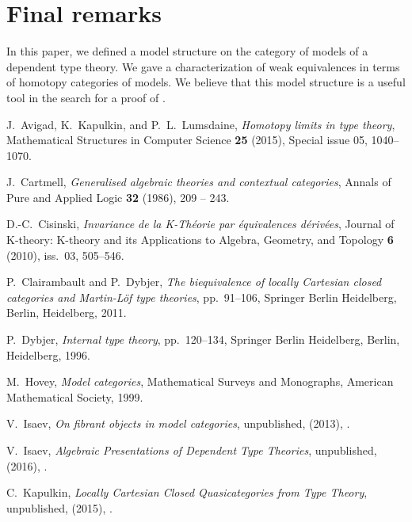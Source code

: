 \documentclass{mscs}
\numberwithin{figure}{section}
\begin{document}
\section{Final remarks}

In this paper, we defined a model structure on the category of models of a dependent type theory.
We gave a characterization of weak equivalences in terms of homotopy categories of models.
We believe that this model structure is a useful tool in the search for a proof of .

\begin{thebibliography}{}
J.~{Avigad}, K.~{Kapulkin}, and P.~L.~{Lumsdaine}, \emph{Homotopy
  limits in type theory}, Mathematical Structures in Computer Science
  \textbf{25} (2015), Special issue 05, 1040--1070.

J.~{Cartmell}, \emph{Generalised algebraic theories and contextual categories},
  Annals of Pure and Applied Logic \textbf{32} (1986), 209 -- 243.

D.-C.~{Cisinski}, \emph{Invariance de la {K-Th\'eorie} par \'equivalences
  d\'eriv\'ees}, Journal of K-theory: K-theory and its Applications to Algebra,
  Geometry, and Topology \textbf{6} (2010), iss.~03, 505--546.

P.~{Clairambault} and P.~{Dybjer}, \emph{The biequivalence of locally
  Cartesian closed categories and Martin-L{\"o}f type theories}, pp.~91--106,
  Springer Berlin Heidelberg, Berlin, Heidelberg, 2011.

P.~{Dybjer}, \emph{Internal type theory}, pp.~120--134, Springer Berlin
  Heidelberg, Berlin, Heidelberg, 1996.

M.~{Hovey}, \emph{Model categories}, Mathematical Surveys and Monographs,
  American Mathematical Society, 1999.

V.~{Isaev}, \emph{On fibrant objects in model categories}, unpublished, (2013),
  \href {http://arxiv.org/abs/1312.4327} {}.

V.~{Isaev}, \emph{{Algebraic Presentations of Dependent Type Theories}},
  unpublished, (2016), \href {http://arxiv.org/abs/1602.08504} {}.

C.~{Kapulkin}, \emph{{Locally Cartesian Closed Quasicategories from Type
  Theory}}, unpublished, (2015), \href {http://arxiv.org/abs/1507.02648}
  {}.


\end{thebibliography}
\end{document}
